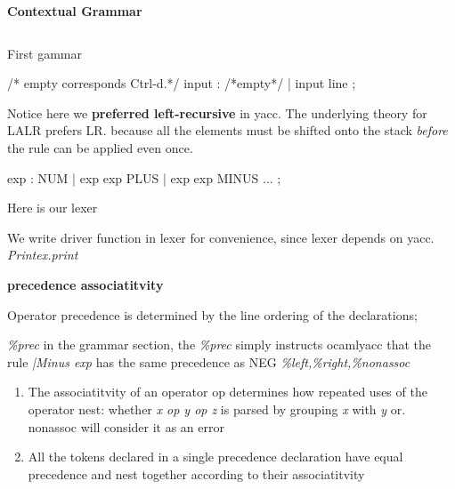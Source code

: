 \textbf{Contextual Grammar}

\inputminted{ocaml}{code/context.ml}


First gammar
\begin{bluecode}
  /* empty corresponds Ctrl-d.*/
  input : /*empty*/ {} | input line {}; 
\end{bluecode}

Notice here we \textbf{preferred left-recursive} in yacc.
The underlying theory for LALR prefers LR. because all the elements
must be shifted onto the stack \textit{before} the rule can be applied even once.

\begin{bluecode}
  exp : NUM | exp exp PLUS | exp exp MINUS  ... ; 
\end{bluecode}

Here is our lexer

We write driver function in lexer for convenience, since lexer depends
on yacc. \textit{Printex.print}

\textbf{precedence associatitvity }

Operator precedence is determined by the line ordering of the
declarations; 

\textit{\%prec} in the grammar section, the \textit{\%prec} simply
instructs ocamlyacc that the rule \textit{|Minus exp } has the same
precedence as NEG
\textit{\%left,\%right,\%nonassoc}

\begin{enumerate}
  \item The associatitvity of an operator op determines how repeated
    uses of the operator nest: whether \textit{x op y op z} is parsed
    by grouping \textit{x} with \textit{y} or. nonassoc will consider
    it as an error
  \item All the tokens declared in a single precedence declaration
    have equal precedence and nest together according to their
    associatitvity
  \end{enumerate}

